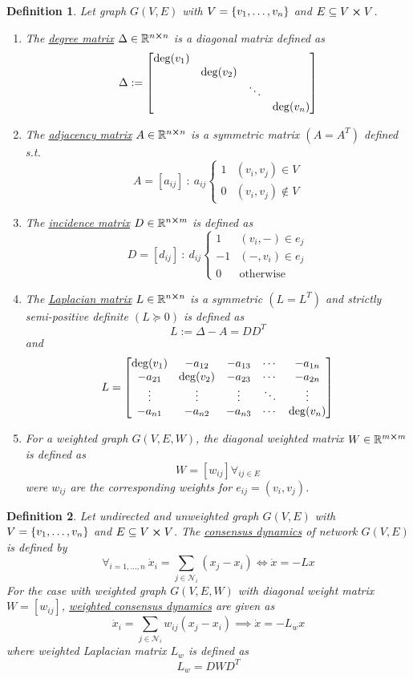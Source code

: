 \documentclass[]{article}
\numberwithin{equation}{section}
\newcommand{\R}{\mathbb{R}}
\newcommand{\st}{\ : \ }
\newtheorem{definition}{Definition}
\begin{document}
\begin{definition} \label{def:graph_matrices}
	Let graph $G(V,E)$ with $V = \qty{v_1,\dots,v_n}$ and $E \subseteq V \cross V$.
	\begin{enumerate}
		\item The \underline{\emph{degree matrix}} $\Delta \in \R^{n\cross n}$ is a diagonal matrix defined as \[
			\Delta := \mqty[\dmat{\deg(v_1), \deg(v_2), \ddots, \deg(v_n)}]
		\]
		\item The \emph{\underline{adjacency matrix}} $A \in \R^{n\cross n}$ is a symmetric matrix $(A = A^T)$ defined s.t. \[
			A = [a_{ij}] \st a_{ij} \begin{cases}
				1 &(v_i,v_j) \in V\\
				0 &(v_i,v_j) \notin V
			\end{cases}
		\]
		\item The \emph{\underline{incidence matrix}} $D \in \R^{n \cross m}$ is defined as\[
			D = [d_{ij}] \st d_{ij} \begin{cases}
				1 	&(v_i,-) \in e_{j}\\
				-1	&(-,v_i) \in e_{j}\\
				0	&\text{otherwise}
			\end{cases}
		\]
		\item The \emph{\underline{Laplacian matrix}} $L \in \R^{n \cross n}$ is a symmetric $(L = L^T)$ and strictly semi-positive definite $(L \succeq 0)$ is defined as\[
			L := \Delta - A = D D^T
		\]and\[
			L = \mqty[
				\deg(v_1)	&-a_{12}	&-a_{13}	&\cdots	&-a_{1n}\\
				-a_{21}		&\deg(v_2)	&-a_{23}	&\cdots	&-a_{2n}\\
				\vdots		&\vdots		&\vdots		&\ddots	&\vdots\\
				-a_{n1}		&-a_{n2}	&-a_{n3}	&\cdots	&\deg(v_n)
			]
		\]
		\item For a weighted graph $G(V,E,W)$, the diagonal weighted matrix $W\in \R^{m\cross m}$ is defined as\[
			W = [w_{ij}] \forall_{ij \in E}
		\]
		were $w_{ij}$ are the corresponding weights for $e_{ij} = (v_i,v_j)$.
	\end{enumerate}
\end{definition}

\begin{definition} \label{def:consensus_dynamics}
	Let undirected and unweighted graph $G(V,E)$ with $V = \qty{v_1,\dots,v_n}$ and $E \subseteq V \cross V$.
	The \emph{\underline{consensus dynamics}} of network $G(V,E)$ is defined by\[
		\forall_{i=1,\dots,n} \ \dot{x}_i = \sum_{j\in \mathcal{N}_i} (x_j - x_i)
		\iff \dot{x} = -L x
	\] For the case with weighted graph $G(V,E,W)$ with diagonal weight matrix $W = [w_{ij}]$, 
	\emph{\underline{weighted consensus dynamics}} are given as\[
		\dot{x}_i = \sum_{j\in\mathcal{N}_i} w_{ij} (x_j - x_i) 
		\implies \dot{x} = - L_{w} x
	\]where weighted Laplacian matrix $L_{w}$ is defined as\[
		L_{w} = D W D^T
	\]
\end{definition}
\end{document}
